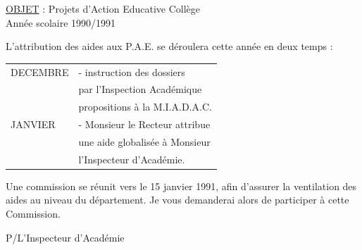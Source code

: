 \uline{OBJET} : Projets d'Action Educative Collège\\
Année scolaire 1990/1991

L'attribution des aides aux P.A.E. se déroulera cette année en deux temps :

\begin{tabular}{l p{.72\linewidth}}
DECEMBRE & - instruction des dossiers\\
&par l'Inspection Académique\\[1em]
&propositions à la M.I.A.D.A.C.\\[1em]
JANVIER & - Monsieur le Recteur attribue\\
&une aide globalisée à Monsieur\\
&l'Inspecteur d'Académie.
\end{tabular}

Une commission se réunit vers le 15 janvier 1991, afin d'assurer la ventilation des aides au niveau du département. Je vous demanderai alors de participer à cette Commission.

P/L'Inspecteur d'Académie



